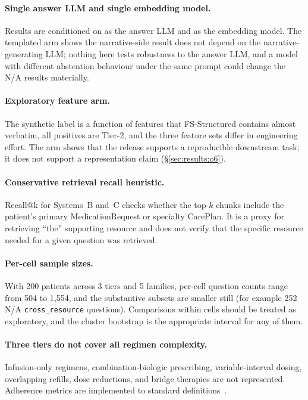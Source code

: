 \paragraph{Single answer LLM and single embedding model.}
Results are conditioned on  as the answer LLM and
 as the embedding model.  The templated arm shows the
narrative-side result does not depend on the narrative-generating LLM; nothing here
tests robustness to the answer LLM, and a model with different abstention behaviour
under the same prompt could change the N/A results materially.

\paragraph{Exploratory feature arm.}
The synthetic label is a function of features that FS-Structured contains almost
verbatim, all positives are Tier-2, and the three feature sets differ in engineering
effort.  The arm shows that the release supports a reproducible downstream task; it does
not support a representation claim (\S\ref{sec:results:o6}).

\paragraph{Conservative retrieval recall heuristic.}
Recall@k for Systems~B and~C checks whether the top-$k$ chunks include the patient's
primary MedicationRequest or specialty CarePlan.  It is a proxy for retrieving ``the''
supporting resource and does not verify that the specific resource needed for a given
question was retrieved.

\paragraph{Per-cell sample sizes.}
With 200 patients across 3 tiers and 5 families, per-cell question counts range from
504 to 1{,}554, and the substantive subsets are smaller still (for example 252 N/A
\texttt{cross\_resource} questions).  Comparisons within cells should be treated as
exploratory, and the cluster bootstrap is the appropriate interval for any of them.

\paragraph{Three tiers do not cover all regimen complexity.}
Infusion-only regimens, combination-biologic prescribing, variable-interval dosing,
overlapping refills, dose reductions, and bridge therapies are not represented.
Adherence metrics are implemented to standard definitions~\citep{lociganic2015using}.
